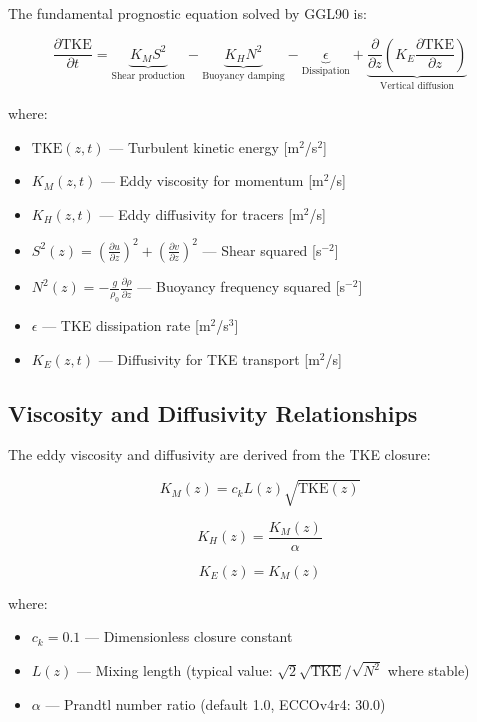 \documentclass[11pt, a4paper]{article}
\begin{document}
The fundamental prognostic equation solved by GGL90 is:

\begin{equation}
\frac{\partial \text{TKE}}{\partial t} = \underbrace{K_M S^2}_{\text{Shear production}} - \underbrace{K_H N^2}_{\text{Buoyancy damping}} - \underbrace{\epsilon}_{\text{Dissipation}} + \underbrace{\frac{\partial}{\partial z}\left(K_E \frac{\partial \text{TKE}}{\partial z}\right)}_{\text{Vertical diffusion}}
\end{equation}

where:

\begin{itemize}
    \item $\text{TKE}(z,t)$ — Turbulent kinetic energy [m$^2$/s$^2$]
    \item $K_M(z,t)$ — Eddy viscosity for momentum [m$^2$/s]
    \item $K_H(z,t)$ — Eddy diffusivity for tracers [m$^2$/s]
    \item $S^2(z) = \left(\frac{\partial u}{\partial z}\right)^2 + \left(\frac{\partial v}{\partial z}\right)^2$ — Shear squared [s$^{-2}$]
    \item $N^2(z) = -\frac{g}{\rho_0}\frac{\partial \rho}{\partial z}$ — Buoyancy frequency squared [s$^{-2}$]
    \item $\epsilon$ — TKE dissipation rate [m$^2$/s$^3$]
    \item $K_E(z,t)$ — Diffusivity for TKE transport [m$^2$/s]
\end{itemize}

\subsection{Viscosity and Diffusivity Relationships}

The eddy viscosity and diffusivity are derived from the TKE closure:

\begin{equation}
K_M(z) = c_k L(z) \sqrt{\text{TKE}(z)}
\end{equation}

\begin{equation}
K_H(z) = \frac{K_M(z)}{\alpha}
\end{equation}

\begin{equation}
K_E(z) = K_M(z)
\end{equation}

where:

\begin{itemize}
    \item $c_k = 0.1$ — Dimensionless closure constant
    \item $L(z)$ — Mixing length (typical value: $\sqrt{2}\sqrt{\text{TKE}}/\sqrt{N^2}$ where stable)
    \item $\alpha$ — Prandtl number ratio (default 1.0, ECCOv4r4: 30.0)
\end{itemize}
\end{document}
